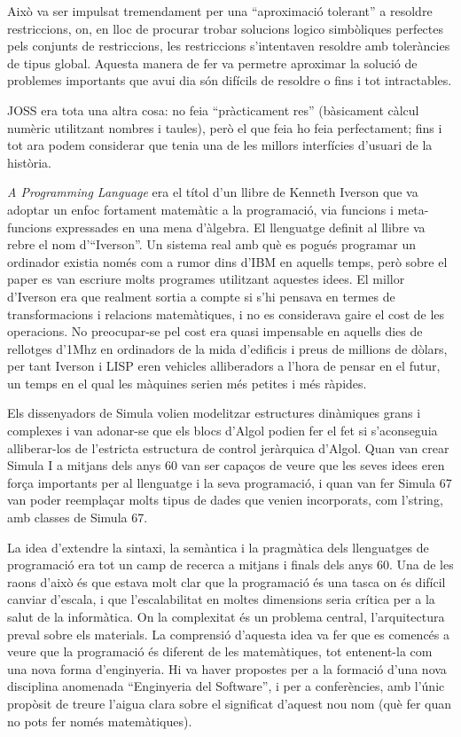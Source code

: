Això va ser impulsat tremendament per una ``aproximació tolerant'' a resoldre restriccions, on, en lloc de procurar trobar solucions logico simbòliques perfectes pels conjunts de restriccions, les restriccions s'intentaven resoldre amb toleràncies de tipus global. Aquesta manera de fer va permetre aproximar la solució de problemes importants que avui dia són difícils de resoldre o fins i tot intractables.

JOSS era tota una altra cosa: no feia ``pràcticament res'' (bàsicament càlcul numèric utilitzant nombres i taules), però el que feia ho feia perfectament; fins i tot ara podem considerar que tenia una de les millors interfícies d'usuari de la història.

\emph{A Programming Language} era el títol d'un llibre de Kenneth Iverson que va adoptar un enfoc fortament matemàtic a la programació, via funcions i meta-funcions expressades en una mena d'àlgebra. El llenguatge definit al llibre va rebre el nom d'``Iverson''. Un sistema real amb què es pogués programar un ordinador existia només com a rumor dins d'IBM en aquells temps, però sobre el paper es van escriure molts programes utilitzant aquestes idees. El millor d'Iverson era que realment sortia a compte si s'hi pensava en termes de transformacions i relacions matemàtiques, i no es considerava gaire el cost de les operacions. No preocupar-se pel cost era quasi impensable en aquells dies de rellotges d'1Mhz en ordinadors de la mida d'edificis i preus de millions de dòlars, per tant Iverson i LISP eren vehicles alliberadors a l'hora de pensar en el futur, un temps en el qual les màquines serien més petites i més ràpides.

Els dissenyadors de Simula volien modelitzar estructures dinàmiques grans i complexes i van adonar-se que els blocs d'Algol podien fer el fet si s'aconseguia alliberar-los de l'estricta estructura de control jeràrquica d'Algol. Quan van crear Simula I a mitjans dels anys 60 van ser capaços de veure que les seves idees eren força importants per al llenguatge i la seva programació, i quan van fer Simula 67 van poder reemplaçar molts tipus de dades que venien incorporats, com l'\textsf{string}, amb classes de Simula 67.

La idea d'extendre la sintaxi, la semàntica i la pragmàtica dels llenguatges de programació era tot un camp de recerca a mitjans i finals dels anys 60. Una de les raons d'això és que estava molt clar que la programació és una tasca on és difícil canviar d'escala, i que l'escalabilitat en moltes dimensions seria crítica per a la salut de la informàtica. On la complexitat és un problema central, l'arquitectura preval sobre els materials. La comprensió d'aquesta idea va fer que es comencés a veure que la programació és diferent de les matemàtiques, tot entenent-la com una nova forma d'enginyeria. Hi va haver propostes per a la formació d'una nova disciplina anomenada ``Enginyeria del Software'', i per a conferències, amb l'únic propòsit de treure l'aigua clara sobre el significat d'aquest nou nom (què fer quan no pots fer només matemàtiques).

